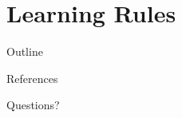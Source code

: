\documentclass[10pt, notes, handout]{beamer}
\begin{document}


\section{Learning Rules}
\begin{frame}{Outline}
    \tableofcontents[currentsection]
\end{frame}




\begin{frame}{References}
    \nocite{*}
    
    
\end{frame}






\begin{frame}[standout]
    Questions?
\end{frame}
\end{document}

